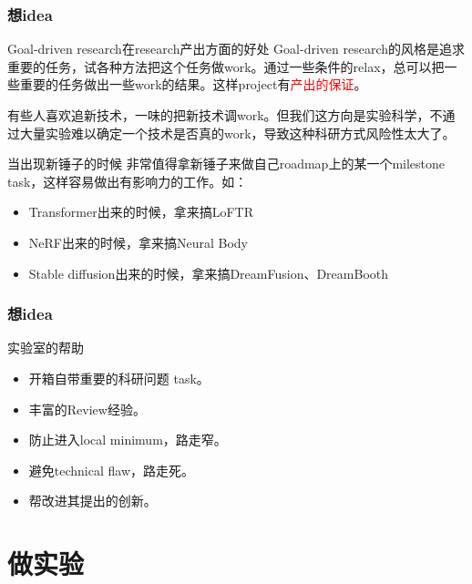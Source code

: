 \documentclass{beamer}
\begin{document}
\begin{frame}
    \frametitle{想idea}
    \begin{block}{Goal-driven research在research产出方面的好处}
        Goal-driven research的风格是追求重要的任务，试各种方法把这个任务做work。通过一些条件的relax，总可以把一些重要的任务做出一些work的结果。这样project有\textcolor{red}{产出的保证}。

        有些人喜欢追新技术，一味的把新技术调work。但我们这方向是实验科学，不通过大量实验难以确定一个技术是否真的work，导致这种科研方式风险性太大了。
    \end{block}
    \begin{block}{当出现新锤子的时候}
        非常值得拿新锤子来做自己roadmap上的某一个milestone task，这样容易做出有影响力的工作。如：
        \begin{itemize}
            \item Transformer出来的时候，拿来搞LoFTR
            \item NeRF出来的时候，拿来搞Neural Body
            \item Stable diffusion出来的时候，拿来搞DreamFusion、DreamBooth
        \end{itemize}
    \end{block}
\end{frame}

\begin{frame}
    \frametitle{想idea}
    \begin{block}{实验室的帮助}
        \begin{itemize}
            \item 开箱自带重要的科研问题 task。
            \item 丰富的Review经验。
            \item 防止进入local minimum，路走窄。
            \item 避免technical flaw，路走死。
            \item 帮改进其提出的创新。
        \end{itemize}
    \end{block}
\end{frame}


\section{做实验}
\end{document}
